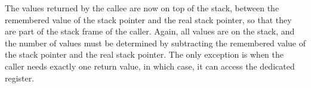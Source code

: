 The values returned by the callee are now on top of the stack, between
the remembered value of the stack pointer and the real stack pointer,
so that they are part of the stack frame of the caller.  Again, all
values are on the stack, and the number of values must be determined
by subtracting the remembered value of the stack pointer and the real
stack pointer.  The only exception is when the caller needs exactly
one return value, in which case, it can access the dedicated register.


